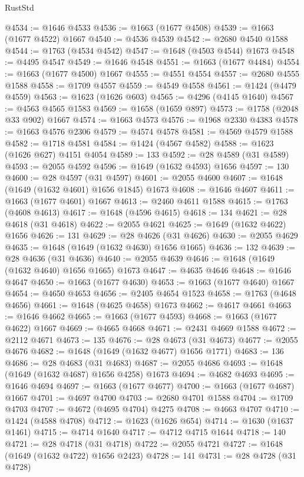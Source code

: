 \begin{lexlean}{RustStd}
\begin{coremodule}
@4534 := @1646 @4533
@4536 := @1663 (@1677 @4508)
@4539 := @1663 (@1677 @4522) @1667
@4540 := @4536 @4539
@4542 := @2680 @4540 @1588
@4544 := @1763 (@4534 @4542)
@4547 := @1648 (@4503 @4544) @1673
@4548 := @4495 @4547
@4549 := @1646 @4548
@4551 := @1663 (@1677 @4484)
@4554 := @1663 (@1677 @4500) @1667
@4555 := @4551 @4554
@4557 := @2680 @4555 @1588
@4558 := @1709 @4557
@4559 := @4549 @4558
@4561 := @1424 (@4479 @4559)
@4563 := @1623 (@1626 @603)
@4565 := @4296 (@4145 @1640)
@4567 := @4563 @4565 @1583
@4569 := @1658 (@1659 @897)
@4573 := @1758 (@2048 @33 @902) @1667
@4574 := @1663 @4573
@4576 := @1968 @2330 @4383
@4578 := @1663 @4576 @2306
@4579 := @4574 @4578
@4581 := @4569 @4579 @1588
@4582 := @1718 @4581
@4584 := @1424 (@4567 @4582)
@4588 := @1623 (@1626 @627) @4151 @4054
@4589 := 133
@4592 := @28 @4589 (@31 @4589)
@4593 := @2055 @4592
@4596 := @1649 (@1632 @4593) @1656
@4597 := 130
@4600 := @28 @4597 (@31 @4597)
@4601 := @2055 @4600
@4607 := @1648 (@1649 (@1632 @4601) @1656 @1845) @1673
@4608 := @1646 @4607
@4611 := @1663 (@1677 @4601) @1667
@4613 := @2460 @4611 @1588
@4615 := @1763 (@4608 @4613)
@4617 := @1648 (@4596 @4615)
@4618 := 134
@4621 := @28 @4618 (@31 @4618)
@4622 := @2055 @4621
@4625 := @1649 (@1632 @4622) @1656
@4626 := 131
@4629 := @28 @4626 (@31 @4626)
@4630 := @2055 @4629
@4635 := @1648 (@1649 (@1632 @4630) @1656 @1665)
@4636 := 132
@4639 := @28 @4636 (@31 @4636)
@4640 := @2055 @4639
@4646 := @1648 (@1649 (@1632 @4640) @1656 @1665) @1673
@4647 := @4635 @4646
@4648 := @1646 @4647
@4650 := @1663 (@1677 @4630)
@4653 := @1663 (@1677 @4640) @1667
@4654 := @4650 @4653
@4656 := @2405 @4654 @1523
@4658 := @1763 (@4648 @4656)
@4661 := @1648 (@4625 @4658) @1673
@4662 := @4617 @4661
@4663 := @1646 @4662
@4665 := @1663 (@1677 @4593)
@4668 := @1663 (@1677 @4622) @1667
@4669 := @4665 @4668
@4671 := @2431 @4669 @1588
@4672 := @2112 @4671
@4673 := 135
@4676 := @28 @4673 (@31 @4673)
@4677 := @2055 @4676
@4682 := @1648 (@1649 (@1632 @4677) @1656 @1771)
@4683 := 136
@4686 := @28 @4683 (@31 @4683)
@4687 := @2055 @4686
@4693 := @1648 (@1649 (@1632 @4687) @1656 @4258) @1673
@4694 := @4682 @4693
@4695 := @1646 @4694
@4697 := @1663 (@1677 @4677)
@4700 := @1663 (@1677 @4687) @1667
@4701 := @4697 @4700
@4703 := @2680 @4701 @1588
@4704 := @1709 @4703
@4707 := @4672 (@4695 @4704) @4275
@4708 := @4663 @4707
@4710 := @1424 (@4588 @4708)
@4712 := @1623 (@1626 @654)
@4714 := @1630 (@1637 @1461)
@4715 := @4714 @1640
@4717 := @4712 @4715 @1644
@4718 := 140
@4721 := @28 @4718 (@31 @4718)
@4722 := @2055 @4721
@4727 := @1648 (@1649 (@1632 @4722) @1656 @2423)
@4728 := 141
@4731 := @28 @4728 (@31 @4728)

\end{coremodule}
\end{lexlean}
